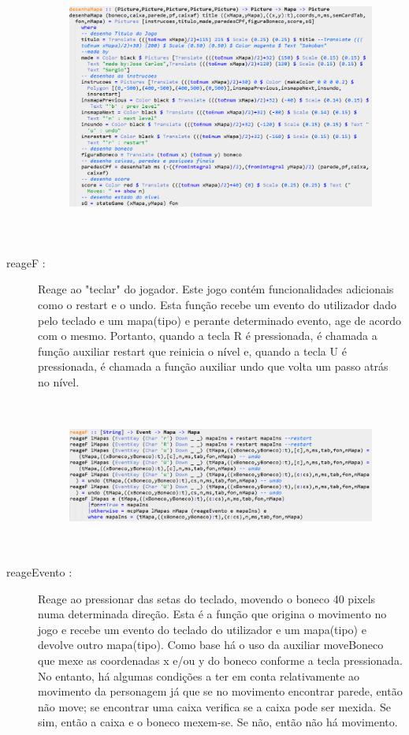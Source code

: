 \documentclass[a4paper]{article}
\begin{document}
\begin{description}
\pagebreak 
\begin{figure}[!htb]
\centering
\includegraphics[height=9cm, width=15cm]{desenhamapa}
\end{figure}
  \item[reageF :] Reage ao "teclar" do jogador. Este jogo contém funcionalidades adicionais como o restart e o undo. Esta função recebe um evento do utilizador dado pelo teclado e um mapa(tipo) e perante determinado evento, age de acordo com o mesmo. Portanto, quando a tecla R é pressionada, é chamada a função auxiliar restart que reinicia o nível e, quando a tecla U é pressionada, é chamada a função auxiliar undo que volta um passo atrás no nível.
\begin{figure}[!htb]
\centering
\includegraphics[height=5cm, width=15cm]{reageF}
\end{figure}
\newpage
  \item[reageEvento :] Reage ao pressionar das setas do teclado, movendo o boneco 40 pixels numa determinada direção. Esta é a função que origina o movimento no jogo e recebe um evento do teclado do utilizador e um mapa(tipo) e devolve outro mapa(tipo). Como base há o uso da auxiliar moveBoneco que mexe as coordenadas x e/ou y do boneco conforme a tecla pressionada. No entanto, há algumas condições a ter em conta relativamente ao movimento da personagem já que se no movimento encontrar parede, então não move; se encontrar uma caixa verifica se a caixa pode ser mexida. Se sim, então a caixa e o boneco mexem-se. Se não, então não há movimento.

\end{description}
\end{document}
